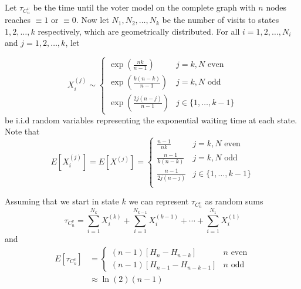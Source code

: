 \begin{theorem}
Let $\tau_{C_n^{v}}$ be the time until the voter model on the complete graph with $n$ nodes reaches $\equiv 1$ or $\equiv 0$.
Now let $N_1, N_2, \ldots, N_k$ be the number of visits to states $1, 2, \ldots, k$ respectively, which are geometrically distributed.
For all $i = 1,2,\ldots, N_i$ and $j = 1,2,\ldots, k$, let

$$
X_i^{(j)} \sim \begin{cases}
  \exp\left(\displaystyle \frac{nk}{n - 1}\right) & j = k, N \text{ even}\\[10pt]
  \exp\left(\displaystyle\frac{k (n - k)}{n - 1}\right) & j = k, N \text{ odd}\\[10pt]
  \exp\left(\displaystyle \frac{2j (n - j)}{n - 1}\right) & j \in \{1, \ldots, k-1\}
\end{cases}
$$
be i.i.d random variables representing the exponential waiting time at each state. Note that
$$
E[X_i^{(j)}] = E[X^{(j)}] = \begin{cases}
  \displaystyle \frac{n - 1}{nk} & j = k, N \text{ even}\\[10pt]
  \displaystyle \frac{n - 1}{k (n - k)} & j = k, N \text{ odd}\\[10pt]
  \displaystyle \frac{n - 1}{2j (n - j)} & j \in \{1,\ldots, k - 1\}\\
\end{cases}
$$

Assuming that we start in state $k$ we can represent $\tau_{C_n^{v}}$ as random sums
\begin{equation}\label{eq:wait_contact_sum_voter}
    \tau_{C_n^{v}} = \sum_{i = 1}^{N_k} X_i^{(k)} + \sum_{i = 1}^{N_{k - 1}} X_i^{(k - 1)} + \cdots + \sum_{i = 1}^{N_1} X_i^{(1)}
\end{equation}
and
\begin{align*}
E[\tau_{C_n^{v}}] &= \begin{cases}
    (n - 1) \left[H_{n} - H_{n - k}\right] & n \text{ even}\\
    (n - 1) \left[H_{n - 1} - H_{n - k - 1}\right] & n \text{ odd}
\end{cases}\\
    &\approx \ln(2) (n - 1)
\end{align*}
\end{theorem}

